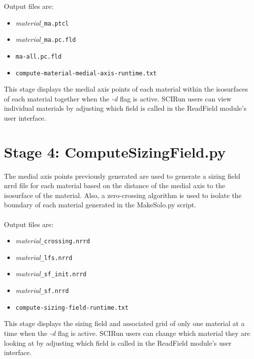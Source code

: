 \documentclass[fleqn,12pt,openany]{book}
\begin{document}
Output files are:
\begin{itemize}

\item{\emph{material}\verb+_ma.ptcl+}
\item{\emph{material}\verb+_ma.pc.fld+}
\item{\verb+ma-all.pc.fld+}
\item{\verb+compute-material-medial-axis-runtime.txt+}

\end{itemize}

This stage displays the medial axis points of each material within the 
isosurfaces of each material together when the \emph{-d} flag is active.  
SCIRun users can view individual materials by adjusting which field is 
called in the ReadField module's user interface.

\section{Stage 4: ComputeSizingField.py}

\paragraph{}
The medial axis points previously generated are used to generate a sizing field 
nrrd file for each material based on the distance of the medial axis to the 
isosurface of the material.  Also, a zero-crossing algorithm is used to isolate 
the boundary of each material generated in the MakeSolo.py script. \\ \\

Output files are:
\begin{itemize}

\item{\emph{material}\verb+_crossing.nrrd+}    
\item{\emph{material}\verb+_lfs.nrrd+}
\item{\emph{material}\verb+_sf_init.nrrd+}
\item{\emph{material}\verb+_sf.nrrd+}
\item{\verb+compute-sizing-field-runtime.txt+}

\end{itemize}

This stage displays the sizing field and associated grid of only one material 
at a time when the \emph{-d} flag is active.  SCIRun users can change which 
material they are looking at by adjusting which field is called in the 
ReadField module's user interface.
\end{document}
